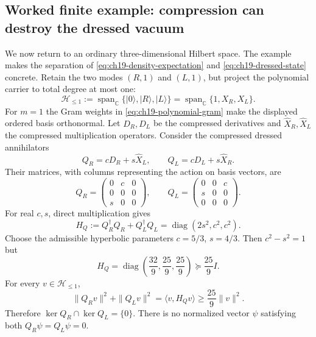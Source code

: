 \subsection{Worked finite example: compression can destroy the dressed vacuum}

We now return to an ordinary three-dimensional Hilbert space.  The
example makes the separation of \eqref{eq:ch19-density-expectation}
and \eqref{eq:ch19-dressed-state} concrete.  Retain the two modes
$(R,1)$ and $(L,1)$, but project the polynomial carrier to total
degree at most one:
\[
 \mathcal H_{\leq1}
  :=\operatorname{span}_{\mathbb C}\{|0\rangle,|R\rangle,|L\rangle\}
  =\operatorname{span}_{\mathbb C}\{1,X_R,X_L\}.
\]
For $m=1$ the Gram weights in \eqref{eq:ch19-polynomial-gram}
make the displayed ordered basis orthonormal.  Let $D_R,D_L$ be the
compressed derivatives and $\widehat X_R,\widehat X_L$ the compressed
multiplication operators.  Consider the compressed dressed annihilators
\begin{equation}
 Q_R=cD_R+s\widehat X_L,
 \qquad Q_L=cD_L+s\widehat X_R.
 \label{eq:ch19-finite-Q-def}
\end{equation}
Their matrices, with columns representing the action on basis vectors,
are
\begin{equation}
 Q_R=\begin{pmatrix}
 0&c&0\\ 0&0&0\\ s&0&0
 \end{pmatrix},\qquad
 Q_L=\begin{pmatrix}
 0&0&c\\ s&0&0\\ 0&0&0
 \end{pmatrix}.
 \label{eq:ch19-finite-Q-matrices}
\end{equation}
For real $c,s$, direct multiplication gives
\begin{equation}
 H_Q:=Q_R^\dagger Q_R+Q_L^\dagger Q_L
   =\operatorname{diag}(2s^2,c^2,c^2).
 \label{eq:ch19-compressed-gram}
\end{equation}
Choose the admissible hyperbolic parameters $c=5/3$, $s=4/3$.
Then $c^2-s^2=1$ but
\begin{equation}
 H_Q=\operatorname{diag}\!\left(\frac{32}{9},
                                    \frac{25}{9},\frac{25}{9}\right)
 \succeq\frac{25}{9}I.
 \label{eq:ch19-compressed-witness}
\end{equation}
For every $v\in\mathcal H_{\leq1}$,
\begin{equation}
 \|Q_Rv\|^2+\|Q_Lv\|^2
 =\langle v,H_Qv\rangle
 \geq\frac{25}{9}\|v\|^2.
 \label{eq:ch19-compressed-coercivity}
\end{equation}
Therefore $\ker Q_R\cap\ker Q_L=\{0\}$.  There is no normalized
vector $\psi$ satisfying both $Q_R\psi=Q_L\psi=0$.

